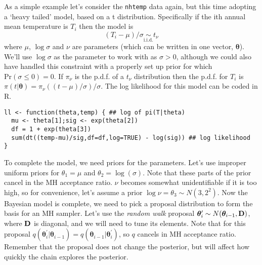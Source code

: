 \documentclass[10pt] {article}
\theoremstyle{definition}
\begin{document}
As a simple example let's consider the {\tt nhtemp} data again, but this time adopting a `heavy tailed' model, based on a t distribution.
Specifically if the ith annual mean temperature is $T_i$ then the model is
$$
(T_i - \mu)/\sigma \underset{\text{i.i.d.}}{\sim} t_\nu
$$
where $\mu$, $\log \sigma$ and $\nu$ are parameters (which can be written in one vector, $\bm \theta$). We'll use $\log \sigma$ as the parameter to work with as $\sigma>0$, although we could also have handled this constraint with a properly set up prior for which $\text{Pr}(\sigma \le 0) = 0$. If $\pi_\nu$ is the p.d.f. of a $t_\nu$ distribution then the p.d.f. for $T_i$ is
$
\pi(t|{\bm \theta}) = \pi_\nu((t-\mu)/\sigma) /\sigma.
$
The log likelihood for this model can be coded in R.
\begin{lstlisting}
ll <- function(theta,temp) { ## log of pi(T|theta)
  mu <- theta[1];sig <- exp(theta[2]) 
  df = 1 + exp(theta[3])
  sum(dt((temp-mu)/sig,df=df,log=TRUE) - log(sig)) ## log likelihood
}
\end{lstlisting}
To complete the model, we need priors for the parameters. Let's use improper uniform priors for $\theta_1 = \mu$ and $\theta_2=\log(\sigma)$.
Note that these parts of the prior cancel in the MH acceptance ratio. $\nu$ becomes somewhat unidentifiable if it is too high, so for convenience, let's assume a prior $\log \nu = \theta_3 \sim N(3,2^2)$. Now the Bayesian model is complete, we need to pick a proposal distribution to form the basis for an MH sampler. 
Let's use the {\em random walk} proposal ${\bm \theta}_i^\prime \sim N({\bm \theta}_{i-1},{\bf D})$, where $\bf D$ is diagonal, and we will need to tune its elements. Note that for this proposal $q({\bm \theta}_i^\prime|{\bm \theta}_{i-1}) = q({\bm \theta}_{i-1}|{\bm \theta}^\prime_i)$, so $q$ cancels in MH acceptance ratio. Remember that the proposal does not change the posterior, but will affect how quickly the chain explores the posterior. 
\end{document}
